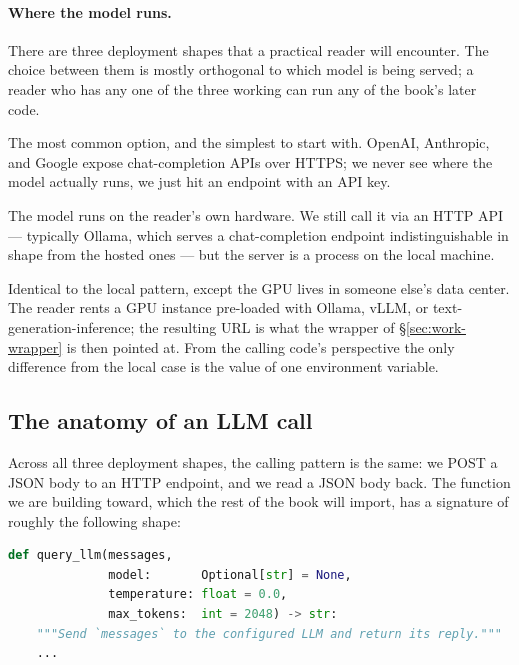 \paragraph{Where the model runs.}
There are three deployment shapes that a practical reader will
encounter. The choice between them is mostly orthogonal to which
model is being served; a reader who has any one of the three
working can run any of the book's later code.

\begin{description}[style=nextline,leftmargin=1.5em,itemsep=0.3em]
\item[Hosted API.] The most common option, and the simplest to
  start with. OpenAI, Anthropic, and Google expose chat-completion
  APIs over HTTPS; we never see where the model actually runs, we
  just hit an endpoint with an API key.
\item[Local model server.] The model runs on the reader's own
  hardware. We still call it via an HTTP API --- typically Ollama,
  which serves a chat-completion endpoint indistinguishable in
  shape from the hosted ones --- but the server is a process on
  the local machine.
\item[Remote model server.] Identical to the local pattern, except
  the GPU lives in someone else's data center. The reader rents a
  GPU instance pre-loaded with Ollama, vLLM, or
  text-generation-inference; the resulting URL is what the
   wrapper of \S\ref{sec:work-wrapper} is then
  pointed at. From the calling code's perspective the only
  difference from the local case is the value of one environment
  variable.
\end{description}

\subsection{The anatomy of an LLM call}
\label{sec:work-anatomy}

Across all three deployment shapes, the calling pattern is the
same: we POST a JSON body to an HTTP endpoint, and we read a JSON
body back. The function we are building toward, which the rest of
the book will import, has a signature of roughly the following
shape:

\begin{lstlisting}[language=Python,caption={The shape of the wrapper we are heading for. The full implementation is in \S\ref{sec:work-wrapper}.},label=lst:query-llm-simple]
def query_llm(messages,
              model:       Optional[str] = None,
              temperature: float = 0.0,
              max_tokens:  int = 2048) -> str:
    """Send `messages` to the configured LLM and return its reply."""
    ...
\end{lstlisting}

